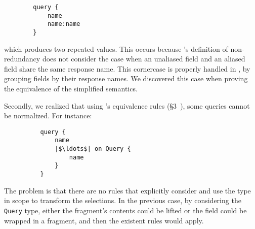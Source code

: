 \begin{verbatim}
        query {
            name
            name:name
        }
\end{verbatim}
which produces two repeated values. This occurs because \HP's definition of non-redundancy does not consider the case when an unaliased field and an aliased field share the same response name. This cornercase is properly handled in \gcoql, by grouping fields by their response names. We discovered this case when proving the equivalence of the simplified semantics.

Secondly, we realized that using \HP's equivalence rules (\cf \S3~\cite{gqlph}), some queries cannot be normalized. For instance:
\begin{verbatim}
          query {
              name
              |$\ldots$| on Query {
                  name
              }
          }
\end{verbatim}
The problem is that there are no rules that explicitly consider and use the type in scope to transform the selections. In the previous case, by considering the \texttt{Query} type, either 
the fragment's contents could be lifted or the field could be wrapped in a fragment, and then the existent rules would apply. 


